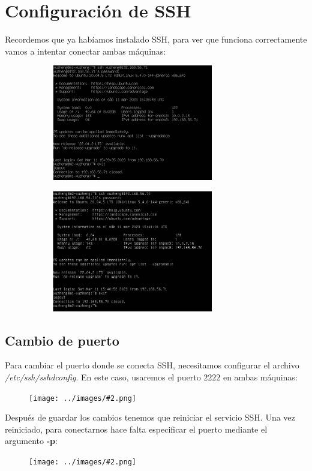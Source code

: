 \documentclass[twoside]{article}
\newcommand{\image}[2]{
\begin{figure}[H]
    \texttt{[image: ../images/\#2.png]}
    \centering
\end{figure}
}
\begin{document}
\section{Configuración de SSH}
Recordemos que ya habíamos instalado SSH, para ver que funciona correctamente vamos a intentar conectar ambas máquinas:
\begin{figure}[H]
    \centering
    \begin{subfigure}{.5\textwidth}
        \centering
        \includegraphics[width=7cm]{../images/32.png}
    \end{subfigure}%
    \begin{subfigure}{.5\textwidth}
        \centering
        \includegraphics[width=7cm]{../images/33.png}
    \end{subfigure}
\end{figure}

\subsection{Cambio de puerto}
Para cambiar el puerto donde se conecta SSH, necesitamos configurar el archivo \textit{/etc/ssh/sshd\textunderscore config}. En este caso, usaremos el puerto $2222$ en ambas máquinas:
\image{8}{34}
Después de guardar los cambios tenemos que reiniciar el servicio SSH. Una vez reiniciado, para conectarnos hace falta especificar el puerto mediante el argumento \textbf{-p}:
\image{8}{35}
\end{document}
